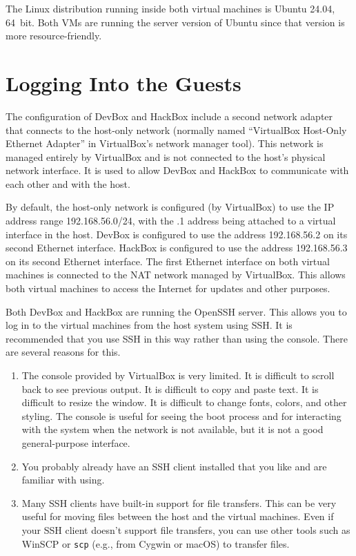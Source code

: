 \documentclass[twocolumn]{article}
\begin{document}
The Linux distribution running inside both virtual machines is Ubuntu 24.04, 64~bit. Both VMs
are running the server version of Ubuntu since that version is more resource-friendly.

\section{Logging Into the Guests}
\label{sec:logging-in}

The configuration of DevBox and HackBox include a second network adapter that connects to the
host-only network (normally named ``VirtualBox Host-Only Ethernet Adapter'' in VirtualBox's
network manager tool). This network is managed entirely by VirtualBox and is not connected to
the host's physical network interface. It is used to allow DevBox and HackBox to communicate
with each other and with the host.

By default, the host-only network is configured (by VirtualBox) to use the IP address range
192.168.56.0/24, with the .1 address being attached to a virtual interface in the host. DevBox
is configured to use the address 192.168.56.2 on its second Ethernet interface. HackBox is
configured to use the address 192.168.56.3 on its second Ethernet interface. The first Ethernet
interface on both virtual machines is connected to the NAT network managed by VirtualBox. This
allows both virtual machines to access the Internet for updates and other purposes.

Both DevBox and HackBox are running the OpenSSH server. This allows you to log in to the virtual
machines from the host system using SSH. It is recommended that you use SSH in this way rather
than using the console. There are several reasons for this.

\begin{enumerate}
  \item The console provided by VirtualBox is very limited. It is difficult to scroll back to
    see previous output. It is difficult to copy and paste text. It is difficult to resize the
    window. It is difficult to change fonts, colors, and other styling. The console is useful
    for seeing the boot process and for interacting with the system when the network is not
    available, but it is not a good general-purpose interface.

  \item You probably already have an SSH client installed that you like and are familiar with
    using.
    
  \item Many SSH clients have built-in support for file transfers. This can be very useful for
    moving files between the host and the virtual machines. Even if your SSH client doesn't
    support file transfers, you can use other tools such as WinSCP or \texttt{scp} (e.g., from
    Cygwin or macOS) to transfer files.
\end{enumerate}
\end{document}
